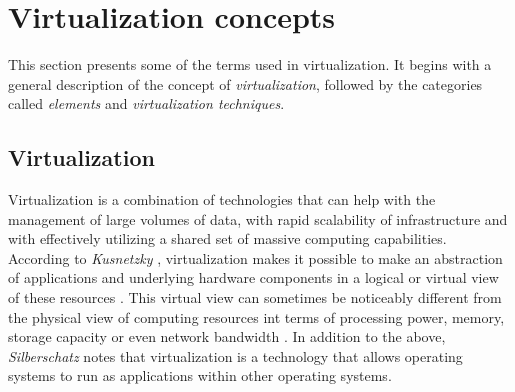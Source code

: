 	\section {Virtualization concepts}\label{sec:concetposVirtualizacion}	
	
	This section presents some of the terms used in virtualization. 
	It begins with a general description of the concept of \textit{virtualization}, followed by the categories called \textit{elements} and \textit{virtualization techniques}.
	
	\subsection{Virtualization}
	
	Virtualization is a combination of technologies that can help with the management of large volumes of data, with rapid scalability of infrastructure and with effectively utilizing a shared set of massive computing capabilities. According to \textit{Kusnetzky} \cite{Kusnetzky2011}, virtualization makes it possible to make an abstraction of applications and underlying hardware components in a logical or virtual view of these resources \cite{AbdElRahem2016}. This virtual view can sometimes be noticeably different from the physical view of computing resources int terms of processing power, memory, storage capacity or even network bandwidth \cite{Stallings2015}. In addition to the above, \textit{Silberschatz} \cite{Silberschatz2014} notes that virtualization is a technology that allows operating systems to run as applications within other operating systems.
	
	
	
	
